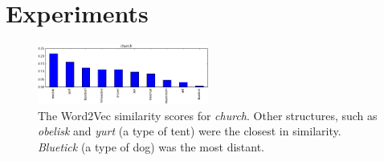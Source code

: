\section{Experiments}

\begin{figure}[!tb]
  \centering
  \includegraphics[width=0.5\textwidth]{figs/word2vec_church.png}
  \caption{
    The Word2Vec similarity scores for \emph{church}. Other structures, such as
    \emph{obelisk} and \emph{yurt} (a type of tent) were the closest in
    similarity. \emph{Bluetick} (a type of dog) was the most distant.
  }
  \label{fig:word2vec_similarities}
\end{figure}





